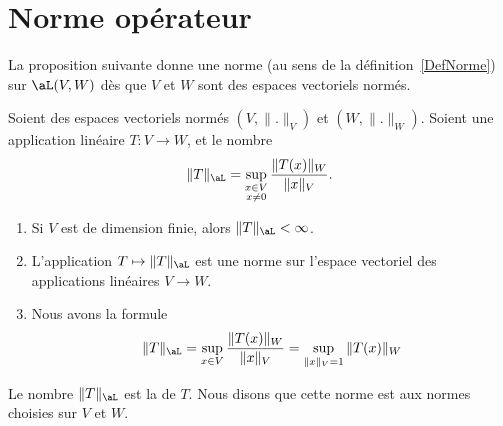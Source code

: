 \section{Norme opérateur}

La proposition suivante donne une norme (au sens de la définition~\ref{DefNorme}) sur \( \aL(V,W)\) dès que \( V\) et \( W\) sont des espaces vectoriels normés.
\begin{propositionDef}          \label{DefNFYUooBZCPTr}
	Soient des espaces vectoriels normés \( (V,\| . \|_V)\) et \( (W,\| . \|_W)\). Soient une application linéaire \( T\colon V\to W\), et le nombre
	\begin{equation}
		\|T\|_{\aL}=\sup_{\substack{x\in V\\x\neq 0}}\frac{\|T(x)\|_{W}}{\|x\|_{V}}.
	\end{equation}
	\begin{enumerate}
		\item       \label{ITEMooGIPIooUvVBIv}
		      Si \( V\) est de dimension finie, alors \( \| T \|_{\aL}<\infty\).
		\item
		      L'application \( T\mapsto\| T \|_{\aL}\) est une norme sur l'espace vectoriel des applications linéaires \( V\to W\).
		\item       \label{ITEMooUQPRooYQGZzu}
		      Nous avons la formule
		      \begin{equation}    \label{EqFZPooIoecGH}
			      \| T \|_{\aL}=\sup_{x\in V}\frac{\|T(x)\|_{W}}{\|x\|_{V}} =\sup_{\|x\|_{V}=1}\|T(x)\|_{W}
		      \end{equation}
	\end{enumerate}
	Le nombre \( \| T \|_{\aL}\) est la  de \( T\). Nous disons que cette norme est  aux normes choisies sur \( V\) et \( W\).
\end{propositionDef}

